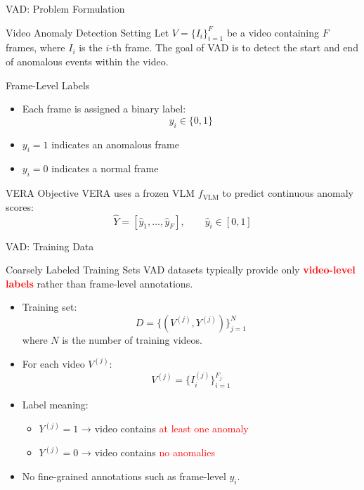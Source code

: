 \documentclass[aspectratio=169,xcolor=dvipsnames]{beamer}
\begin{document}
	
	\begin{frame}{VAD: Problem Formulation}
		\small
		
		\begin{block}{Video Anomaly Detection Setting}
			Let \(V = \{I_i\}_{i=1}^{F}\) be a video containing \(F\) frames, where \(I_i\) is the \(i\)-th frame.
			The goal of VAD is to detect the start and end of anomalous events within the video.
		\end{block}
		
		\begin{block}{Frame-Level Labels}
			\begin{itemize}
				\item Each frame is assigned a binary label:
				\[
				y_i \in \{0,1\}
				\]
				\item \(y_i = 1\) indicates an anomalous frame
				\item \(y_i = 0\) indicates a normal frame
			\end{itemize}
		\end{block}
		
		\begin{block}{VERA Objective}
			VERA uses a frozen VLM \(f_{\mathrm{VLM}}\) to predict continuous anomaly scores:
			\[
			\hat{Y} = [\hat{y}_1, \dots, \hat{y}_F], \qquad \hat{y}_i \in [0,1]
			\]
		\end{block}
		
	\end{frame}
	
	\begin{frame}{VAD: Training Data}
		\small
		
		\begin{block}{Coarsely Labeled Training Sets}
			VAD datasets typically provide only \textbf{\textcolor{red}{video-level labels}} rather than frame-level annotations.
		\end{block}
		
		\begin{itemize}
			\item Training set:
			\[
			D = \{(V^{(j)}, Y^{(j)})\}_{j=1}^{N}
			\]
			where \(N\) is the number of training videos.
			
			\item For each video \(V^{(j)}\):
			\[
			V^{(j)} = \{ I^{(j)}_i \}_{i=1}^{F_j}
			\]
			
			\item Label meaning:
			\begin{itemize}
				\item \(Y^{(j)} = 1\) → video contains \textcolor{red}{at least one anomaly}
				\item \(Y^{(j)} = 0\) → video contains \textcolor{red}{no anomalies}
			\end{itemize}
			
			\item No fine-grained annotations such as frame-level \(y_i\).
			
		\end{itemize}
		
		
	\end{frame}
	
\end{document}
